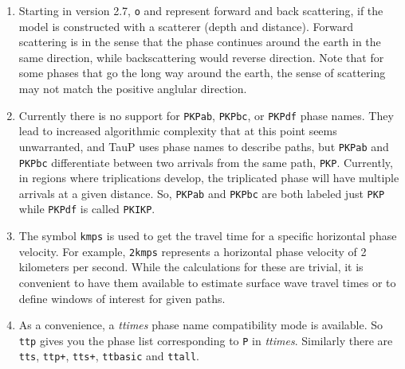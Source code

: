 \begin{enumerate}
\item
Starting in version 2.7, \texttt{o} and  represent forward and back
scattering, if the model is constructed with a scatterer (depth and distance).
Forward scattering is in the sense that the phase continues around the earth
in the same direction, while backscattering would reverse direction.
Note that for some phases that go the long way around the earth, the sense of
scattering may not match the positive anglular direction.

\item Currently there is no support for \texttt{PKPab}, \texttt{PKPbc},
or \texttt{PKPdf} phase names.
They lead to increased algorithmic complexity that at this point seems
unwarranted, and TauP uses phase names to describe paths, but
\texttt{PKPab} and \texttt{PKPbc} differentiate between two arrivals from
the same path, \texttt{PKP}.
Currently, in regions where triplications develop, the triplicated phase will have multiple
arrivals at a given distance.
So, \texttt{PKPab} and \texttt{PKPbc} are
both labeled just \texttt{PKP} while \texttt{PKPdf} is called \texttt{PKIKP}.

\item \label{kmps}
The symbol \texttt{kmps} is used to get the travel time for a
specific horizontal phase velocity.
For example, \texttt{2kmps} represents a horizontal phase
velocity of 2 kilometers per second.
While the calculations for these are trivial, it is convenient
to have them available to estimate surface wave travel times or to define windows of
interest for given paths.

\item As a convenience, a \textit{ttimes} phase name compatibility mode is available.
So \texttt{ttp} gives
you the phase list corresponding to \texttt{P} in \textit{ttimes}.
Similarly there are \texttt{tts}, \texttt{ttp+},
\texttt{tts+}, \texttt{ttbasic} and \texttt{ttall}.

\end{enumerate}
